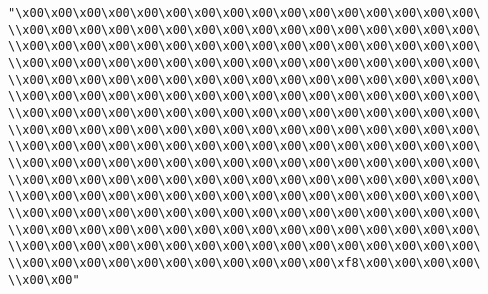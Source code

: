 \verb|"\x00\x00\x00\x00\x00\x00\x00\x00\x00\x00\x00\x00\x00\x00\x00\x00\|\newline
\verb|\\x00\x00\x00\x00\x00\x00\x00\x00\x00\x00\x00\x00\x00\x00\x00\x00\|\newline
\verb|\\x00\x00\x00\x00\x00\x00\x00\x00\x00\x00\x00\x00\x00\x00\x00\x00\|\newline
\verb|\\x00\x00\x00\x00\x00\x00\x00\x00\x00\x00\x00\x00\x00\x00\x00\x00\|\newline
\verb|\\x00\x00\x00\x00\x00\x00\x00\x00\x00\x00\x00\x00\x00\x00\x00\x00\|\newline
\verb|\\x00\x00\x00\x00\x00\x00\x00\x00\x00\x00\x00\x00\x00\x00\x00\x00\|\newline
\verb|\\x00\x00\x00\x00\x00\x00\x00\x00\x00\x00\x00\x00\x00\x00\x00\x00\|\newline
\verb|\\x00\x00\x00\x00\x00\x00\x00\x00\x00\x00\x00\x00\x00\x00\x00\x00\|\newline
\verb|\\x00\x00\x00\x00\x00\x00\x00\x00\x00\x00\x00\x00\x00\x00\x00\x00\|\newline
\verb|\\x00\x00\x00\x00\x00\x00\x00\x00\x00\x00\x00\x00\x00\x00\x00\x00\|\newline
\verb|\\x00\x00\x00\x00\x00\x00\x00\x00\x00\x00\x00\x00\x00\x00\x00\x00\|\newline
\verb|\\x00\x00\x00\x00\x00\x00\x00\x00\x00\x00\x00\x00\x00\x00\x00\x00\|\newline
\verb|\\x00\x00\x00\x00\x00\x00\x00\x00\x00\x00\x00\x00\x00\x00\x00\x00\|\newline
\verb|\\x00\x00\x00\x00\x00\x00\x00\x00\x00\x00\x00\x00\x00\x00\x00\x00\|\newline
\verb|\\x00\x00\x00\x00\x00\x00\x00\x00\x00\x00\x00\x00\x00\x00\x00\x00\|\newline
\verb|\\x00\x00\x00\x00\x00\x00\x00\x00\x00\x00\x00\xf8\x00\x00\x00\x00\|\newline
\verb|\\x00\x00"|\newline
